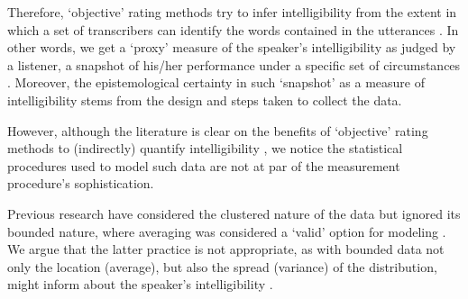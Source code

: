 \begin{comment}
	
	As the literature suggests, objective rating procedures produce more valid\footnote{validity is understood as the extent to which scores are appropriate for their intended interpretation and use \cite{Lesterhuis_2018, Trochim_2022}.} and reliable\footnote{reliability is though as the extend to which a measure would give us the same result over and over again \cite{Trochim_2022}, i.e. measure something, free from error, in a consistent way.} scores than any other available procedure \cite{Boonen_et_al_2021, Faes_et_al_2021}, as the method does not hinge in the use or production of a \textit{subjective rating scale}, i.e. a scale based on a personal perception of the child's intelligibility. Moreover, the previous advantages are further emphasized by the use of stimuli gathered from spontaneous speech tasks, as they have a greater level of ecological validity, especially compared to contextualized utterances or reading at loud tasks \cite{Flipsen_2006, Ertmer_2011}.
	
\end{comment}

Therefore, `objective' rating methods try to infer intelligibility from the extent in which a set of transcribers can identify the words contained in the utterances \cite{Boonen_et_al_2021}. In other words, we get a `proxy' measure of the speaker's intelligibility as judged by a listener, a snapshot of his/her performance under a specific set of circumstances \cite{Hustad_et_al_2020}. Moreover, the epistemological certainty in such ‘snapshot’ as a measure of intelligibility stems from the design and steps taken to collect the data.

However, although the literature is clear on the benefits of `objective' rating methods to (indirectly) quantify intelligibility \cite{Boonen_et_al_2020, Boonen_et_al_2021, Hustad_et_al_2020}, we notice the statistical procedures used to model such data are not at par of the measurement procedure's sophistication.

Previous research have considered the clustered nature of the data but ignored its bounded nature, where averaging was considered a `valid' option for modeling \cite{Boonen_et_al_2021}. We argue that the latter practice is not appropriate, as with bounded data not only the location (average), but also the spread (variance) of the distribution, might inform about the speaker's intelligibility \cite{Nelder_et_al_1983}.


